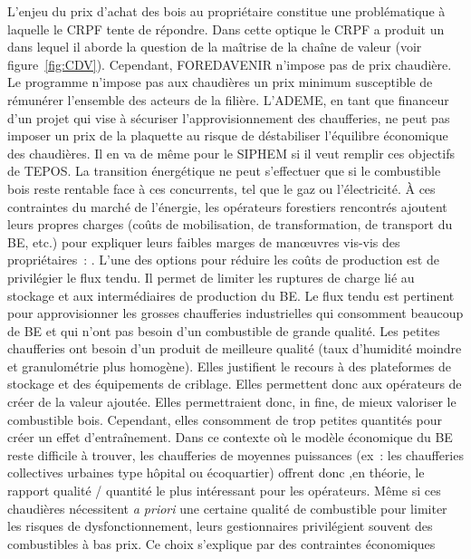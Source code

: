 \documentclass[12pt]{report}
\newcounter{table1}
\newcommand\indexp[1]{#1\index{#1}}
\begin{document}
L'enjeu du prix d'achat des bois au propriétaire constitue une problématique à
laquelle le CRPF tente de répondre. Dans cette optique
le CRPF a produit un~
dans lequel il aborde la question de la maîtrise de la chaîne de valeur (voir
figure~\ref{fig:CDV}). Cependant, FOREDAVENIR n'impose pas de
prix chaudière. Le programme n'impose pas aux chaudières un prix minimum
susceptible de rémunérer l'ensemble des acteurs de la filière. L'\indexp{ADEME},
en tant que financeur d'un projet qui vise à sécuriser l'approvisionnement des
chaufferies, ne peut pas imposer un prix de la plaquette au risque de
déstabiliser l'équilibre économique des chaudières. Il en va de même pour le
\indexp{SIPHEM} si il veut remplir ces objectifs de \indexp{TEPOS}. La
transition énergétique ne peut s'effectuer que si le combustible bois reste
rentable face à ces concurrents, tel que le gaz ou l'électricité.
À ces contraintes du marché de l’énergie, les opérateurs forestiers rencontrés
ajoutent leurs propres charges (coûts de mobilisation, de transformation, de
transport du BE, etc.) pour expliquer leurs faibles marges de manœuvres vis-vis des
propriétaires~: . L’une des options pour réduire les coûts de production est de
privilégier le flux tendu. Il permet de limiter les ruptures de charge lié au
stockage et aux intermédiaires de production du BE. Le flux tendu est pertinent
pour approvisionner les grosses chaufferies industrielles qui consomment beaucoup
de BE et qui n’ont pas besoin d’un combustible de grande qualité. Les petites
chaufferies ont besoin d’un produit de meilleure qualité (taux d’humidité
moindre et granulométrie plus homogène). Elles justifient le recours à des
plateformes de stockage et des équipements de criblage. Elles permettent donc
aux opérateurs de créer de la valeur ajoutée. Elles permettraient
donc, in fine, de mieux valoriser le combustible bois. Cependant, elles
consomment de trop petites quantités pour créer un effet d’entraînement. Dans
ce contexte où le modèle économique du BE reste difficile à trouver, les
chaufferies de moyennes puissances (ex : les chaufferies collectives urbaines
type hôpital ou écoquartier) offrent donc ,en théorie, le rapport qualité /
quantité le plus intéressant pour les opérateurs. Même si ces chaudières
nécessitent \textit{a priori} une certaine qualité de combustible pour limiter les
risques de dysfonctionnement, leurs gestionnaires privilégient souvent des
combustibles à bas prix. Ce choix s’explique par des contraintes économiques
\end{document}
